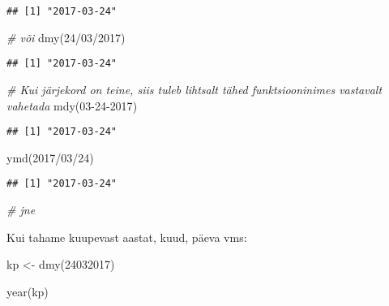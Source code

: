 \documentclass[
]{book}
\newenvironment{Shaded}{\begin{snugshade}}{\end{snugshade}}
\newcommand{\CommentTok}[1]{\textcolor[rgb]{0.56,0.35,0.01}{\textit{#1}}}
\newcommand{\DecValTok}[1]{\textcolor[rgb]{0.00,0.00,0.81}{#1}}
\newcommand{\FunctionTok}[1]{\textcolor[rgb]{0.00,0.00,0.00}{#1}}
\newcommand{\NormalTok}[1]{#1}
\newcommand{\OtherTok}[1]{\textcolor[rgb]{0.56,0.35,0.01}{#1}}
\newcommand{\StringTok}[1]{\textcolor[rgb]{0.31,0.60,0.02}{#1}}
\begin{document}
\begin{verbatim}
## [1] "2017-03-24"
\end{verbatim}

\begin{Shaded}
\begin{Highlighting}[]
\CommentTok{\# või}
\FunctionTok{dmy}\NormalTok{(}\StringTok{\textquotesingle{}24/03/2017\textquotesingle{}}\NormalTok{)}
\end{Highlighting}
\end{Shaded}

\begin{verbatim}
## [1] "2017-03-24"
\end{verbatim}

\begin{Shaded}
\begin{Highlighting}[]
\CommentTok{\# Kui järjekord on teine, siis tuleb lihtsalt tähed funktsiooninimes vastavalt vahetada}
\FunctionTok{mdy}\NormalTok{(}\StringTok{\textquotesingle{}03{-}24{-}2017\textquotesingle{}}\NormalTok{)}
\end{Highlighting}
\end{Shaded}

\begin{verbatim}
## [1] "2017-03-24"
\end{verbatim}

\begin{Shaded}
\begin{Highlighting}[]
\FunctionTok{ymd}\NormalTok{(}\StringTok{\textquotesingle{}2017/03/24\textquotesingle{}}\NormalTok{)}
\end{Highlighting}
\end{Shaded}

\begin{verbatim}
## [1] "2017-03-24"
\end{verbatim}

\begin{Shaded}
\begin{Highlighting}[]
\CommentTok{\# jne}
\end{Highlighting}
\end{Shaded}

Kui tahame kuupevast aastat, kuud, päeva vms:

\begin{Shaded}
\begin{Highlighting}[]
\NormalTok{kp }\OtherTok{\textless{}{-}} \FunctionTok{dmy}\NormalTok{(}\DecValTok{24032017}\NormalTok{)}

\FunctionTok{year}\NormalTok{(kp)}
\end{Highlighting}
\end{Shaded}
\end{document}
